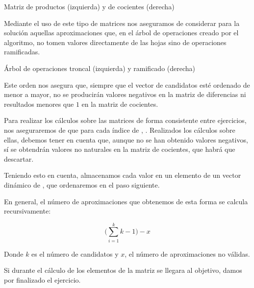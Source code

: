 \begin{center}
Matriz de productos (izquierda) y de cocientes (derecha)
\end{center}

Mediante el uso de este tipo de matrices nos aseguramos de considerar para la solución aquellas aproximaciones que, en el árbol de operaciones creado por el algoritmo, no tomen valores directamente de las hojas sino de operaciones ramificadas.

\begin{center}

Árbol de operaciones troncal (izquierda) y ramificado (derecha)
\end{center}

Este orden nos asegura que, siempre que el vector de candidatos esté ordenado de menor a mayor, no se producirán valores negativos en la matriz de diferencias ni resultados menores que $1$ en la matriz de cocientes.

Para realizar los cálculos sobre las matrices de forma consistente entre ejercicios, nos aseguraremos de que para cada índice  de , .
Realizados los cálculos sobre ellas, debemos tener en cuenta que, aunque no se han obtenido valores negativos, sí se obtendrán valores no naturales en la matriz de cocientes, que habrá que descartar.

Teniendo esto en cuenta, almacenamos cada valor en un elemento de un vector dinámico de , que ordenaremos en el paso siguiente.

En general, el número de aproximaciones que obtenemos de esta forma se calcula recursivamente:

\begin{center}
\[\Bigg(\sum_{i=1}^{k}k-1\Bigg)-x\]

Donde $k$ es el número de candidatos y $x$, el número de aproximaciones no válidas.
\end{center}

Si durante el cálculo de los elementos de la matriz se llegara al objetivo, damos por finalizado el ejercicio.

